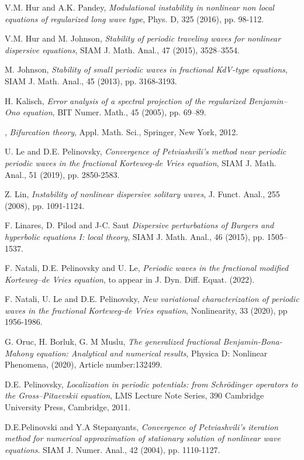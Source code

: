 \documentclass[12pt,reqno]{amsart}
\newcommand{\2}{L^2_{per}(0, T)}
\numberwithin{equation}{section}
\numberwithin{figure}{section}
\begin{document}
\begin{thebibliography}{99}
 {\sc V.M. Hur and A.K. Pandey}, \textit{Modulational instability in nonlinear non local equations of regularized long wave type}, Phys. D, 325 (2016), pp. 98-112.


 {\sc V.M. Hur and M. Johnson}, \textit{Stability of periodic traveling waves
	for nonlinear dispersive equations}, SIAM J. Math. Anal.,  47 (2015), 3528--3554.




 {\sc M. Johnson}, \textit{ Stability of small periodic waves in fractional KdV-type equations}, SIAM J. Math. Anal., 45 (2013), pp. 3168-3193.


 {\sc H. Kalisch}, \textit{Error analysis of a spectral projection of the regularized Benjamin–Ono equation}, BIT Numer. Math., 45 (2005), pp. 69–89.



, \textit{Bifurcation theory}, Appl. Math. Sci., Springer, New York, 2012.

 {\sc U. Le and D.E. Pelinovsky}, \textit{Convergence of Petviashvili's method near periodic periodic waves in the fractional Korteweg-de Vries equation}, SIAM J. Math. Anal., 51 (2019), pp. 2850-2583.

 {\sc Z. Lin}, \textit{Instability of nonlinear dispersive solitary waves},
J. Funct. Anal., 255 (2008), pp. 1091-1124.


 {\sc F. Linares, D. Pilod and J-C. Saut} \textit{Dispersive perturbations of Burgers and hyperbolic
equations I: local theory}, SIAM J. Math. Anal., 46 (2015), pp. 1505–1537.

 {\sc F. Natali, D.E. Pelinovsky and U. Le}, \textit{Periodic waves in the fractional modified Korteweg--de Vries equation}, to appear in J. Dyn. Diff. Equat. (2022).


 {\sc F. Natali, U. Le and D.E. Pelinovsky}, \textit{New variational characterization of periodic waves in the fractional Korteweg-de Vries equation}, Nonlinearity, 33 (2020), pp 1956-1986.

 {\sc G. Oruc, H. Borluk, G. M Muslu}, \textit{The generalized fractional Benjamin-Bona-Mahony equation: Analytical and numerical results},
    Physica D: Nonlinear Phenomena, (2020), Article number:132499.


 {\sc D.E. Pelinovsky}, \textit{Localization in periodic potentials: from Schr\"{o}dinger operators
	to the Gross--Pitaevskii equation}, LMS Lecture Note Series,  390 Cambridge University Press, Cambridge, 2011.

 {\sc D.E.Pelinovski and Y.A Stepanyants}, \textit{Convergence of Petviashvili's iteration method for numerical approximation of stationary solution  of nonlinear wave equations}. SIAM J. Numer. Anal., 42 (2004), pp. 1110-1127.

\end{thebibliography}
\end{document}

